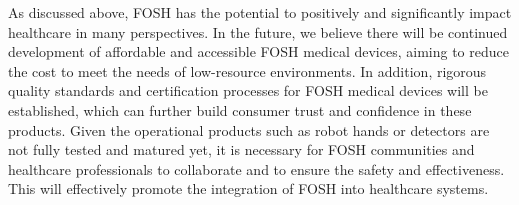 \documentclass[final-report.tex]{subfiles}
\begin{document}

As discussed above, FOSH has the potential to positively and significantly impact healthcare in many perspectives. In the future, we believe there will be continued development of affordable and accessible FOSH medical devices, aiming to reduce the cost to meet the needs of low-resource environments. In addition, rigorous quality standards and certification processes for FOSH medical devices will be established, which can further build consumer trust and confidence in these products. Given the operational products such as robot hands or detectors are not fully tested and matured yet, it is necessary for FOSH communities and healthcare professionals to collaborate and to ensure the safety and effectiveness. This will effectively promote the integration of FOSH into healthcare systems.
\end{document}
